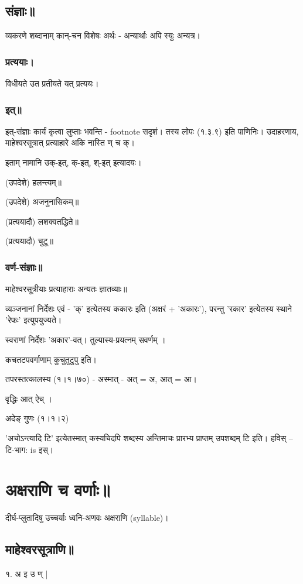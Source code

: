\documentclass[oneside, article]{memoir}
\begin{document}
\section{संज्ञाः॥}
व्यकरणे शब्दानाम् कान्-चन विशेषः अर्थः - अन्यार्थाः अपि स्युः अन्यत्र।

\subsection{प्रत्ययाः।}
विधीयते उत प्रतीयते यत्  प्रत्ययः।

\subsection{इत्॥}
इत्-संज्ञाः कार्यं कृत्वा लुप्ताः भवन्ति - footnote सदृशं। तस्य लोपः (१.३.९) इति पाणिनिः। उदाहरणाय, माहेश्वरसूत्रात् प्रत्याहारे अकि नास्ति ण् च क्।

इताम् नामानि उक्-इत्, क्-इत्, श्-इत् इत्यादयः।

(उपदेशे) हलन्त्यम्॥

(उपदेशे) अजनुनासिकम्॥

(प्रत्ययादौ) लशक्वतद्धिते॥

(प्रत्ययादौ) चुटू॥

\subsection{वर्ण-संज्ञाः॥}
माहेश्वरसूत्रीयाः प्रत्याहाराः अन्यतः ज्ञातव्याः॥

व्यञ्जनानां निर्देशः एवं - 'क्' इत्येतस्य ककारः इति (अक्षरं + 'अकारः'), परन्तु 'रकार' इत्येतस्य स्थाने 'रेफः' इत्युपयुज्यते।

स्वराणां निर्देशः 'अकार'-वत्। तुल्यास्य-प्रयत्नम् सवर्णम् ।

कचतटपवर्गाणाम् कुचुतुटुपु इति।

तपरस्तत्कालस्य (१।१।७०)  - अस्मात् - अत् = अ, आत् = आ।

वृद्धिः आत् ऐच् ।

अदेङ् गुणः (१।१।२)

'अचोऽन्त्यादि टि' इत्येतस्मात् कस्यचिदपि शब्दस्य अन्तिमाचः प्रारभ्य प्राप्तम् उपशब्दम् टि इति। हविस् – टि-भाग: is इस्।

\chapter{अक्षराणि च वर्णाः॥}
दीर्घ-प्लुतादिषु उच्चर्याः ध्वनि-अणवः अक्षराणि (syllable)।

\section{माहेश्वरसूत्राणि॥}
१. अ इ उ ण् |
\end{document}
